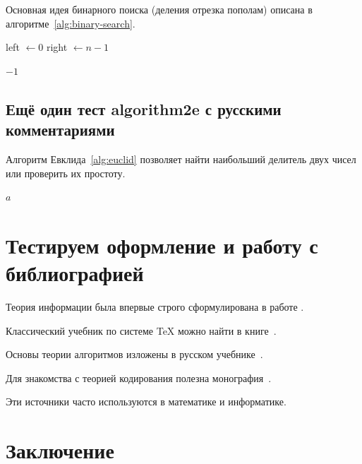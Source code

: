 \documentclass{cmcmsuthesis-phd}
\begin{document}
Основная идея бинарного поиска (деления отрезка пополам) описана в алгоритме~\ref{alg:binary-search}.

\begin{algorithm}[H]

left $\gets 0$\;
right $\gets n - 1$\;


\KwRet $-1$\;
\caption{\label{alg:binary-search}Бинарный поиск}
\end{algorithm}
\section{Ещё один тест algorithm2e с русскими комментариями}
\label{sec:org7f4539a}

Алгоритм Евклида~\ref{alg:euclid} позволяет найти наибольший делитель двух чисел или проверить их простоту.

\begin{algorithm}[H]

\KwRet $a$\;
\caption{\label{alg:euclid}Алгоритм Евклида}
\end{algorithm}
\chapter{Тестируем оформление и работу с библиографией}
\label{sec:org6cef2f1}

Теория информации была впервые строго сформулирована в работе
\cite{Shannon1948}.

Классический учебник по системе \TeX{} можно найти в книге~\cite{Knuth1984}.

Основы теории алгоритмов изложены в русском учебнике~\cite{aho1979}.

Для знакомства с теорией кодирования полезна монография~\cite{macwilliams1979}.

Эти источники часто используются в математике и информатике.
\chapter*{Заключение}
\label{sec:org6441a30}
\end{document}
